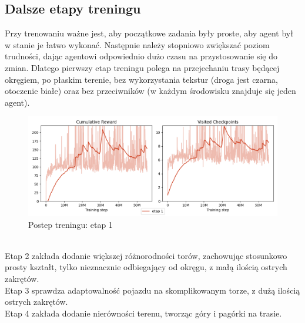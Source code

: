 \subsection{Dalsze etapy treningu}
Przy trenowaniu ważne jest, aby początkowe zadania były proste, aby agent był w stanie je łatwo wykonać. Następnie należy stopniowo zwiększać poziom trudności, dając agentowi odpowiednio dużo czasu na przystosowanie się do zmian. Dlatego pierwszy etap treningu polega na przejechaniu trasy będącej okręgiem, po płaskim terenie, bez wykorzystania tekstur (droga jest czarna, otoczenie białe) oraz bez przeciwników (w każdym środowisku znajduje się jeden agent).
\begin{figure}[H]
    \centering
    \includegraphics[width=\textwidth]{graphs/training_progress_1.png}
    \caption{Postep treningu: etap 1}
    \label{fig}
\end{figure}
\phantom{.}\\
Etap 2 zakłada dodanie większej różnorodności torów, zachowując stosunkowo prosty kształt, tylko nieznacznie odbiegający od okręgu, z małą ilością ostrych zakrętów.\\
Etap 3 sprawdza adaptowalność pojazdu na skomplikowanym torze, z dużą ilością ostrych zakrętów.\\
Etap 4 zakłada dodanie nierówności terenu, tworząc góry i pagórki na trasie.\\
